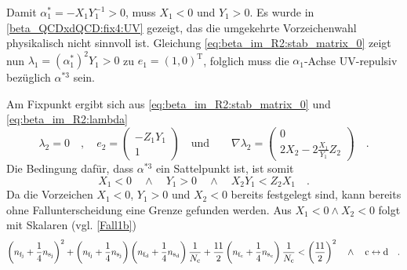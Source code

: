     Damit $\alpha^*_1=-X_1 Y_1^{-1} > 0$, muss $X_1<0$ und $Y_1>0$. Es wurde 
    in \ref{beta_QCDxdQCD:fix4:UV} gezeigt, das die umgekehrte Vorzeichenwahl 
    physikalisch nicht sinnvoll ist. Gleichung 
    \eqref{eq:beta_im_R2:stab_matrix_0} zeigt nun 
    $\lambda_1=(\alpha^*_1)^2Y_1 > 0$ zu $e_1=(1,0)^\text{T}$, folglich muss 
    die $\alpha_1$-Achse UV-repulsiv bezüglich $\alpha^{*3}$ sein. 
    
    Am Fixpunkt ergibt sich aus \eqref{eq:beta_im_R2:stab_matrix_0} und 
    \eqref{eq:beta_im_R2:lambda} 
    \begin{equation}
     \lambda_2=0 \quad , \quad  e_2=\begin{pmatrix}
                            -Z_1 Y_1 \\ 1
                           \end{pmatrix}
                           \quad \text{und} \quad
    \quad \nabla \lambda_2 = \begin{pmatrix}
                              0 \\ 2 X_2 -2\frac{X_1}{Y_1} Z_2
                             \end{pmatrix}
                             \quad .
    \end{equation}
    Die Bedingung dafür, dass $\alpha^{*3}$ ein Sattelpunkt ist, ist somit 
    \begin{equation}
     X_1<0 \quad \land \quad Y_1>0 \quad \land \quad X_2 Y_1 < Z_2 X_1
     \quad .
    \end{equation}
    Da die Vorzeichen $X_1<0$, $Y_1>0$ und $X_2<0$ bereits festgelegt sind, 
    kann bereits ohne Fallunterscheidung eine Grenze gefunden werden.
    Aus $X_1<0 \land X_2<0$ folgt mit Skalaren (vgl. \eqref{Fall1b})
	\begin{equation}
	  \left(n_{\text{f}_\text{j}}+\frac{1}{4} n_{\text{s}_\text{j}} \right)^2 + \left( n_{\text{f}_\text{j}}+\frac{1}{4}n_{\text{s}_\text{j}} 
	  \right) \left( n_{\text{f}_\text{d}} +\frac14 n_{\text{s}_\text{d}} \right)\frac1{N_\text{c}} 
	  + \frac{11}{2} \left(n_{\text{f}_\text{c}}+\frac14 n_{\text{s}_\text{c}} \right)\frac1{N_\text{c}} < 
	  \left( \frac{11}{2} \right)^2 \quad \land \quad \text{c}
	  \leftrightarrow
	  \text{d} \quad.
	\end{equation}
    